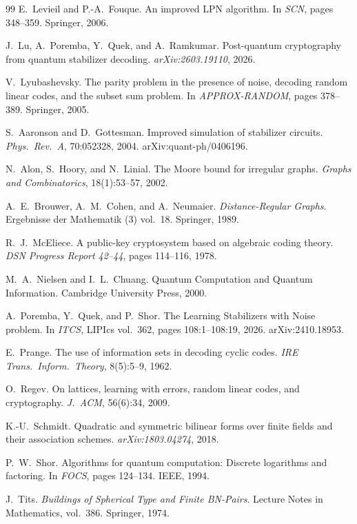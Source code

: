 \documentclass[11pt,a4paper]{article}
\theoremstyle{plain}
\theoremstyle{definition}
\begin{document}
\begin{thebibliography}{99}
E.~Levieil and P.-A.~Fouque.
An improved LPN algorithm.
In \emph{SCN}, pages 348--359. Springer, 2006.

J.~Lu, A.~Poremba, Y.~Quek, and A.~Ramkumar.
Post-quantum cryptography from quantum stabilizer decoding.
\emph{arXiv:2603.19110}, 2026.

V.~Lyubashevsky.
The parity problem in the presence of noise, decoding random linear codes, and the subset sum problem.
In \emph{APPROX-RANDOM}, pages 378--389. Springer, 2005.

S.~Aaronson and D.~Gottesman.
Improved simulation of stabilizer circuits.
\emph{Phys.\ Rev.\ A}, 70:052328, 2004. arXiv:quant-ph/0406196.

N.~Alon, S.~Hoory, and N.~Linial.
The Moore bound for irregular graphs.
\emph{Graphs and Combinatorics}, 18(1):53--57, 2002.

A.~E.~Brouwer, A.~M.~Cohen, and A.~Neumaier.
\emph{Distance-Regular Graphs}.
Ergebnisse der Mathematik (3) vol.~18. Springer, 1989.

R.~J.~McEliece.
A public-key cryptosystem based on algebraic coding theory.
\emph{DSN Progress Report 42--44}, pages 114--116, 1978.

M.~A.~Nielsen and I.~L.~Chuang.
Quantum Computation and Quantum Information.
Cambridge University Press, 2000.

A.~Poremba, Y.~Quek, and P.~Shor.
The Learning Stabilizers with Noise problem.
In \emph{ITCS}, LIPIcs vol.~362, pages 108:1--108:19, 2026. arXiv:2410.18953.

E.~Prange.
The use of information sets in decoding cyclic codes.
\emph{IRE Trans.\ Inform.\ Theory}, 8(5):5--9, 1962.

O.~Regev.
On lattices, learning with errors, random linear codes, and cryptography.
\emph{J.\ ACM}, 56(6):34, 2009.

K.-U.~Schmidt.
Quadratic and symmetric bilinear forms over finite fields and their association schemes.
\emph{arXiv:1803.04274}, 2018.

P.~W.~Shor.
Algorithms for quantum computation: Discrete logarithms and factoring.
In \emph{FOCS}, pages 124--134. IEEE, 1994.

J.~Tits.
\emph{Buildings of Spherical Type and Finite BN-Pairs}.
Lecture Notes in Mathematics, vol.~386. Springer, 1974.

\end{thebibliography}
\end{document}
